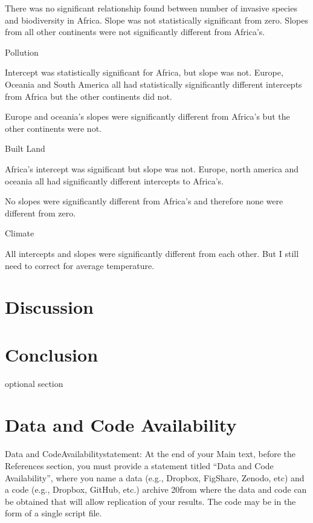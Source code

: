 \documentclass[11pt, a4paper, titlepage]{article}
\begin{document}
There was no significant relationship found between number of invasive species and biodiversity in Africa. Slope was not statistically significant from zero. Slopes from all other continents were not significantly different from Africa's. \newline

Pollution \newline

Intercept was statistically significant for Africa, but slope was not. Europe, Oceania and South America all had statistically significantly different intercepts from Africa but the other continents did not.

Europe and oceania's slopes were significantly different from Africa's but the other continents were not. \newline

Built Land \newline

Africa's intercept was significant but slope was not. Europe, north america and oceania all had significantly different intercepts to Africa's.

No slopes were significantly different from Africa's and therefore none were different from zero. \newline

Climate \newline

All intercepts and slopes were significantly different from each other. But I still need to correct for average temperature.
 
	 
	 
	 

    \clearpage
    
     \section*{Discussion}
     
     \clearpage
     
     \section*{Conclusion }
     optional section
     \clearpage
    
    \section*{Data and Code Availability}
    Data  and  CodeAvailabilitystatement:  At  the  end  of  your  Main  text,  before  the  References section, you must provide a statement titled “Data and Code Availability”, where you name a data (e.g., Dropbox, FigShare, Zenodo, etc) and a code (e.g., Dropbox, GitHub, etc.) archive 
    20from where the data and code can be obtained that will allow replication of your results. The code may be in the form of a single script file.
    
    \clearpage
    

    
\end{document}
